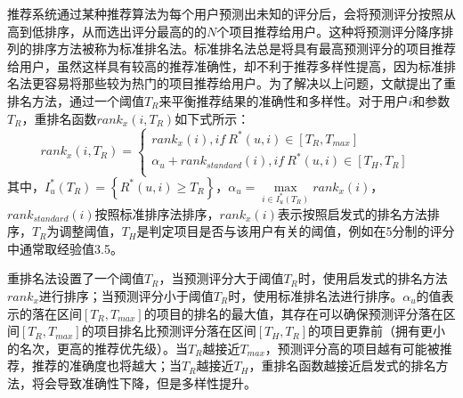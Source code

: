 \documentclass[master,winfonts]{njuthesis}
\begin{document}
推荐系统通过某种推荐算法为每个用户预测出未知的评分后，会将预测评分按照从高到低排序，从而选出评分最高的的$N$个项目推荐给用户。这种将预测评分降序排列的排序方法被称为标准排名法\cite{Adomavicius2009TOWARD}。标准排名法总是将具有最高预测评分的项目推荐给用户，虽然这样具有较高的推荐准确性，却不利于推荐多样性提高，因为标准排名法更容易将那些较为热门的项目推荐给用户。为了解决以上问题，文献\cite{Adomavicius2012Improving}提出了重排名方法，通过一个阈值$T_R$来平衡推荐结果的准确性和多样性。对于用户$i$和参数$T_R$，重排名函数$rank_x(i,T_R)$如下式所示：
\begin{equation}
rank_x(i,T_R) = \left\{  
             \begin{array}{lr}  
            rank_x(i) ,if \ R^*(u,i)\in \left [ T_R,T_{max} \right ] &\\  
             \alpha_u+rank_{standard}(i),if \ R^*(u,i) \in \left [ T_H,T_R \right ]&\\  
      
             \end{array}  
\right.
\end{equation}
其中，$I^*_u(T_R) =\left \{R^*(u,i)\geq T_R  \right \}$，$\alpha_u= \max \limits_{i \in I^*_u(T_R)}rank_x(i)$，$rank_{standard}(i)$按照标准排序法排序，$rank_x(i)$表示按照启发式的排名方法排序，$T_R$为调整阈值，$T_H$是判定项目是否与该用户有关的阈值，例如在5分制的评分中通常取经验值3.5。

重排名法设置了一个阈值$T_R$，当预测评分大于阈值$T_R$时，使用启发式的排名方法$rank_x$进行排序；当预测评分小于阈值$T_R$时，使用标准排名法进行排序。$\alpha_u$的值表示的落在区间$\left [ T_R,T_{max} \right ]$的项目的排名的最大值，其存在可以确保预测评分落在区间$\left [ T_R,T_{max} \right ]$的项目排名比预测评分落在区间$\left [ T_H,T_R \right ]$的项目更靠前（拥有更小的名次，更高的推荐优先级）。当$T_R$越接近$T_{max}$，预测评分高的项目越有可能被推荐，推荐的准确度也将越大；当$T_R$越接近$T_H$，重排名函数越接近启发式的排名方法，将会导致准确性下降，但是多样性提升。
\end{document}
